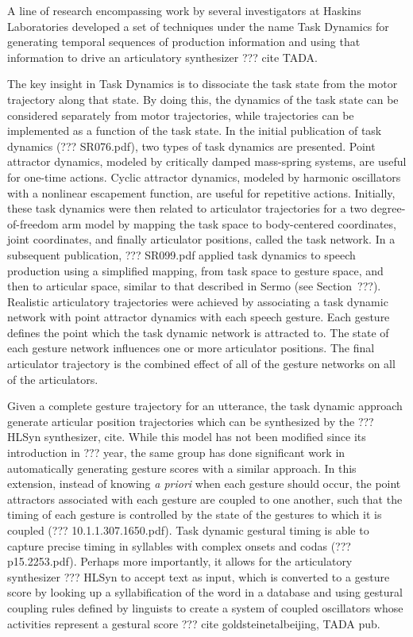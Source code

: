 A line of research encompassing work by
several investigators at Haskins Laboratories
developed a set of techniques
under the name Task Dynamics
for generating temporal sequences
of production information
and using that information to drive
an articulatory synthesizer
??? cite TADA.

The key insight in Task Dynamics
is to dissociate the task state
from the motor trajectory
along that state.
By doing this, the dynamics of the task state
can be considered separately from motor trajectories,
while trajectories can be implemented
as a function of the task state.
In the initial publication of task dynamics
(??? SR076.pdf),
two types of task dynamics are presented.
Point attractor dynamics,
modeled by critically damped mass-spring systems,
are useful for one-time actions.
Cyclic attractor dynamics,
modeled by harmonic oscillators
with a nonlinear escapement function,
are useful for repetitive actions.
Initially, these task dynamics were then
related to articulator trajectories
for a two degree-of-freedom arm model
by mapping the task space
to body-centered coordinates,
joint coordinates,
and finally articulator positions,
called the task network.
In a subsequent publication,
??? SR099.pdf
applied task dynamics to speech production
using a simplified mapping,
from task space
to gesture space,
and then to articular space,
similar to that described in Sermo
(see Section~???).
Realistic articulatory trajectories
were achieved
by associating a task dynamic network
with point attractor dynamics
with each speech gesture.
Each gesture defines
the point which the task dynamic network
is attracted to.
The state of each gesture network
influences one or more articulator positions.
The final articulator trajectory
is the combined effect
of all of the gesture networks
on all of the articulators.

Given a complete gesture trajectory
for an utterance,
the task dynamic approach
generate articular position trajectories
which can be synthesized
by the ??? HLSyn synthesizer, cite.
While this model has not been
modified since its introduction in ??? year,
the same group has done significant work
in automatically generating gesture scores
with a similar approach.
In this extension,
instead of knowing \textit{a priori}
when each gesture should occur,
the point attractors associated
with each gesture are coupled
to one another,
such that the timing of each gesture
is controlled by the state
of the gestures to which it is coupled
(??? 10.1.1.307.1650.pdf).
Task dynamic gestural timing
is able to capture precise timing
in syllables with complex onsets
and codas (??? p15.2253.pdf).
Perhaps more importantly,
it allows for the articulatory synthesizer
??? HLSyn to accept text as input,
which is converted to a gesture score
by looking up a syllabification
of the word in a database
and using gestural coupling rules
defined by linguists
to create a system of coupled oscillators
whose activities represent a gestural score
??? cite goldsteinetalbeijing, TADA pub.

